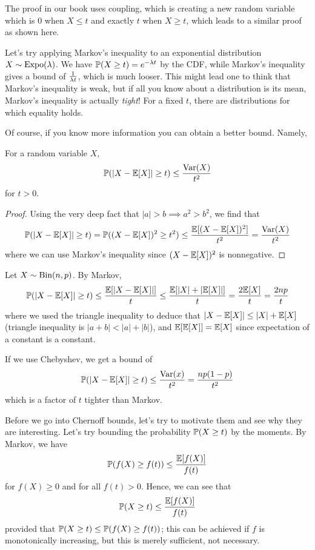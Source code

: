 \documentclass[11 pt]{scrartcl}
\begin{document}
The proof in our book uses coupling, which is creating a new random variable which is $0$ when $X\leq t$ and exactly $t$ when $X\geq t$, which leads to a similar proof as shown here. 

Let's try applying Markov's inequality to an exponential distribution $X\sim \text{Expo}(\lambda)$. We have $\mathbb P(X\geq t) = e^{-\lambda t}$ by the CDF, while Markov's inequality gives a bound of $\frac{1}{\lambda t}$, which is much looser. This might lead one to think that Markov's inequality is weak, but if all you know about a distribution is its mean, Markov's inequality is actually \emph{tight}! For a fixed $t$, there are distributions for which equality holds.

Of course, if you know more information you can obtain a better bound. Namely, 

\begin{theorem}[Chebyshev]
    For a random variable $X$, 
    \[ \mathbb P(|X-\mathbb E[X]| \geq t) \leq \dfrac{\text{Var}(X)}{t^2}\] 
    for $t>0$.
    \label{thm:chebyshev}
\end{theorem}
\begin{proof}
    Using the very deep fact that $|a| > b \implies a^2 > b^2$, we find that 
    \[ \mathbb P(|X-\mathbb E[X]|\geq t) = \mathbb P((X-\mathbb E[X])^2 \geq t^2) \leq \dfrac{\mathbb E[(X-\mathbb E[X])^2]}{t^2} = \dfrac{\text{Var}(X)}{t^2}\]
    where we can use Markov's inequality since $(X-\mathbb E[X])^2$ is nonnegative. 
\end{proof}

\begin{example}
    Let $X\sim \text{Bin}(n,p)$. By Markov, 
    \[ \mathbb P(|X-\mathbb E[X]|\geq t) \leq \dfrac{\mathbb E[|X -\mathbb E[X]|]}{t} \leq \dfrac{\mathbb E[|X|+|\mathbb E[X]|]}{t} = \dfrac{2\mathbb E[X]}{t} = \dfrac{2np}{t}\] 
    where we used the triangle inequality to deduce that $|X-\mathbb E[X]| \leq |X| + \mathbb E[X]$ (triangle inequality is $|a+b| < |a| + |b|$), and $\mathbb E[\mathbb E[X]] = \mathbb E[X]$ since expectation of a constant is a constant. 
    
    If we use Chebyshev, we get a bound of 
    \[ \mathbb P(|X-\mathbb E[X]|\geq t) \leq \dfrac{\text{Var}(x)}{t^2} = \dfrac{np(1-p)}{t^2}\] 
    which is a factor of $t$ tighter than Markov. 
\end{example}

Before we go into Chernoff bounds, let's try to motivate them and see why they are interesting. Let's try bounding the probability $\mathbb P(X\geq t)$ by the moments. By Markov, we have 
\[ \mathbb P(f(X) \geq f(t)) \leq \dfrac{\mathbb E[f(X)]}{f(t)}\] 
for $f(X) \geq 0$ and for all $f(t) > 0$. Hence, we can see that 
\[ \mathbb P(X \geq t) \leq \dfrac{\mathbb E[f(X)]}{f(t)}\] 
provided that $\mathbb P(X\geq t) \leq \mathbb P(f(X) \geq f(t))$; this can be achieved if $f$ is monotonically increasing, but this is merely sufficient, not necessary. 
\end{document}

